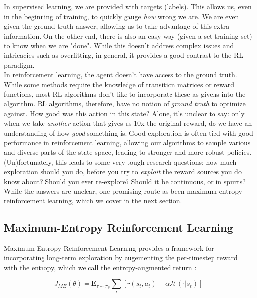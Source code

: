 \documentclass[12pt]{article}
\begin{document}
\noindent In supervised learning, we are provided with targets (labels). This allows us, even in the beginning of training, to quickly gauge \textit{how} wrong we are. We are even given the ground truth answer, allowing us to take advantage of this extra information. On the other end, there is also an easy way (given a set training set) to know when we are "done". While this doesn't address complex issues and intricacies such as overfitting, in general, it provides a good contrast to the RL paradigm. \\

\noindent In reinforcement learning, the agent doesn't have access to the ground truth. While some methods require the knowledge of transition matrices or reward functions, most RL algorithms don't like to incorporate these as givens into the algorithm. RL algorithms, therefore, have no notion of \textit{ground truth} to optimize against. How good was this action in this state? Alone, it's unclear to say: only when we take \textit{another} action that gives us 10x the original reward, do we have an understanding of how \textit{good} something is. Good exploration is often tied with good performance in reinforcement learning, allowing our algorithms to sample various and diverse parts of the state space, leading to stronger and more robust policies. \\

\noindent (Un)fortunately, this leads to some very tough research questions: how much exploration should you do, before you try to \textit{exploit} the reward sources you do know about? Should you ever re-explore? Should it be continuous, or in spurts? While the answers are unclear, one promising route as been maximum-entropy reinforcement learning, which we cover in the next section.

\subsection{Maximum-Entropy Reinforcement Learning}

\noindent Maximum-Entropy Reinforcement Learning \cite{maxentzeibart} provides a framework for incorporating long-term exploration by augementing the per-timestep reward with the entropy, which we call the entropy-augmented return \cite{schulman2017equivalence}:

\begin{equation}
    J_{ME}(\theta) = \mathbf{E}_{\tau \sim \pi_\theta} \sum_t [r(s_t, a_t) + \alpha \mathcal{H}( \cdot | s_t) ]
\end{equation}
\end{document}
